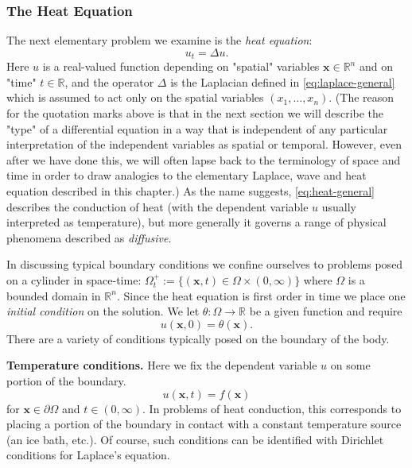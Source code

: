 \subsubsection{The Heat Equation}\label{subsec:heat-equation}

The next elementary problem we examine is the \emph{heat equation}:
\begin{equation}\label{eq:heat-general}
u_t=\Delta u.
\end{equation}
Here $u$ is a real-valued function depending on "spatial" variables $\bm{x}\in\mathbb{R}^n$ and on "time" $t\in\mathbb{R}$, and the operator $\Delta$ is the Laplacian defined in \eqref{eq:laplace-general} which is assumed to act only on the spatial variables $(x_1,\ldots,x_n)$. (The reason for the quotation marks above is that in the next section we will describe the "type" of a differential equation in a way that is independent of any particular interpretation of the independent variables as spatial or temporal. However, even after we have done this, we will often lapse back to the terminology of space and time in order to draw analogies to the elementary Laplace, wave and heat equation described in this chapter.) As the name suggests, \eqref{eq:heat-general} describes the conduction of heat (with the dependent variable $u$ usually interpreted as temperature), but more generally it governs a range of physical phenomena described as \emph{diffusive}.

In discussing typical boundary conditions we confine ourselves to problems posed on a cylinder in space-time: $\Omega_t^+:=\{(\bm{x},t)\in\Omega\times(0,\infty)\}$ where $\Omega$ is a bounded domain in $\mathbb{R}^n$. Since the heat equation is first order in time we place one \emph{initial condition} on the solution. We let $\theta:\Omega\to\mathbb{R}$ be a given function and require
\begin{equation}\label{eq:heat-general-initial}
u(\bm{x},0)=\theta(\bm{x}).
\end{equation}
There are a variety of conditions typically posed on the boundary of the body.

\textbf{Temperature conditions.} Here we fix the dependent variable $u$ on some portion of the boundary.
\begin{equation}\label{eq:heat-temperature-boundary}
u(\bm{x},t)=f(\bm{x})
\end{equation}
for $\bm{x}\in\partial\Omega$ and $t\in(0,\infty)$. In problems of heat conduction, this corresponds to placing a portion of the boundary in contact with a constant temperature source (an ice bath, etc.). Of course, such conditions can be identified with Dirichlet conditions for Laplace's equation.

